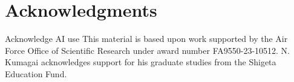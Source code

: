 \documentclass{article}
\begin{document}
\section{Acknowledgments}
Acknowledge AI use
This material is based upon work supported by the Air Force Office of Scientific Research under award number FA9550-23-10512. N. Kumagai acknowledges support for his graduate studies from the Shigeta Education Fund.



\end{document}
